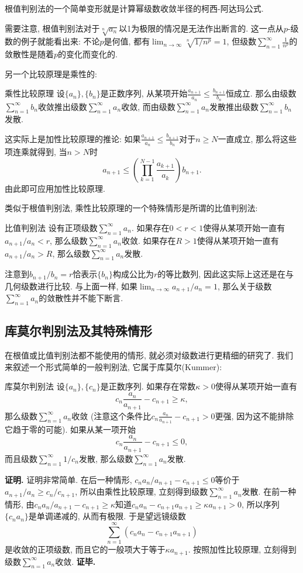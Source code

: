 根值判别法的一个简单变形就是计算幂级数收敛半径的柯西-阿达玛公式.

需要注意, 根值判别法对于$\sqrt[n]{a_n}$以1为极限的情况是无法作出断言的. 这一点从$p$-级数的例子就能看出来: 不论$p$是何值, 都有$\lim_{n\to\infty}\sqrt[n]{1/n^p}=1$, 但级数$\sum_{n=1}^\infty\frac{1}{n^p}$的敛散性是随着$p$的变化而变化的.

另一个比较原理是乘性的:
\begin{theorem}{乘性比较原理}
设$\{a_n\},\{b_n\}$是正数序列, 从某项开始$\frac{a_{n+1}}{a_n}\leq \frac{b_{n+1}}{b_n}$恒成立. 那么由级数$\sum_{n=1}^\infty b_n$收敛推出级数$\sum_{n=1}^\infty a_n$收敛, 而由级数$\sum_{n=1}^\infty a_n$发散推出级数$\sum_{n=1}^\infty b_n$发散.
\end{theorem}
这实际上是加性比较原理的推论: 如果$\frac{a_{n+1}}{a_n}\leq \frac{b_{n+1}}{b_n}$对于$n\geq N$一直成立, 那么将这些项连乘就得到, 当$n>N$时
$$
a_{n+1}\leq \left(\prod_{k=1}^{N-1}\frac{a_{k+1}}{a_k}\right)b_{n+1}.
$$
由此即可应用加性比较原理.

类似于根值判别法, 乘性比较原理的一个特殊情形是所谓的比值判别法:
\begin{theorem}{比值判别法}
设有正项级数$\sum_{n=1}^\infty a_n$. 如果存在$0<r<1$使得从某项开始一直有$a_{n+1}/a_n<r$, 那么级数$\sum_{n=1}^\infty a_n$收敛. 如果存在$R>1$使得从某项开始一直有$a_{n+1}/{a_n}>R$, 那么级数$\sum_{n=1}^\infty a_n$发散.
\end{theorem}
注意到$b_{n+1}/b_n=r$恰表示$\{b_n\}$构成公比为$r$的等比数列, 因此这实际上这还是在与几何级数进行比较. 与上面一样, 如果$\lim_{n\to\infty}a_{n+1}/a_n=1$, 那么关于级数$\sum_{n=1}^\infty a_n$的敛散性并不能下断言.

\subsection{库莫尔判别法及其特殊情形}
在根值或比值判别法都不能使用的情形, 就必须对级数进行更精细的研究了. 我们来叙述一个形式简单的一般判别法, 它属于库莫尔(Kummer):

\begin{theorem}{库莫尔判别法}
设$\{a_n\},\{c_n\}$是正数序列. 如果存在常数$\kappa>0$使得从某项开始一直有
$$
c_n\frac{a_n}{a_{n+1}}-c_{n+1}\geq \kappa,
$$
那么级数$\sum_{n=1}^\infty a_n$收敛 (注意这个条件比$c_n\frac{a_n}{a_{n+1}}-c_{n+1}>0$更强, 因为这不能排除它趋于零的可能). 如果从某一项开始
$$
c_n\frac{a_n}{a_{n+1}}-c_{n+1} \leq0,
$$
而且级数$\sum_{n=1}^\infty 1/c_n$发散, 那么级数$\sum_{n=1}^\infty a_n$发散.
\end{theorem}
\textbf{证明.} 证明非常简单. 在后一种情形, $c_n{a_n}/{a_{n+1}}-c_{n+1} \leq0$等价于$a_{n+1}/a_n\geq c_{n}/c_{n+1}$, 所以由乘性比较原理, 立刻得到级数$\sum_{n=1}^\infty a_n$发散. 在前一种情形, 由$c_n{a_n}/{a_{n+1}}-c_{n+1}\geq \kappa$知道$c_na_n-c_{n+1}a_{n+1}\geq \kappa a_{n+1}>0$, 所以序列$\{c_na_n\}$是单调递减的, 从而有极限. 于是望远镜级数
$$
\sum_{n=1}^\infty (c_na_n-c_{n+1}a_{n+1})
$$
是收敛的正项级数, 而且它的一般项大于等于$\kappa a_{n+1}$. 按照加性比较原理, 立刻得到级数$\sum_{n=1}^\infty a_n$收敛. \textbf{证毕.}

